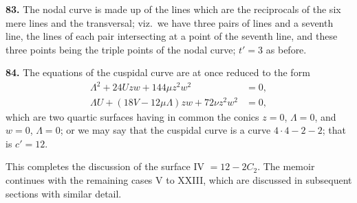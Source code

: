 \documentclass[11pt,a4paper]{article}
\theoremstyle{definition}
\begin{document}
\textbf{83.} The nodal curve is made up of the lines which are the reciprocals of the six mere lines and the transversal; viz.\ we have three pairs of lines and a seventh line, the lines of each pair intersecting at a point of the seventh line, and these three points being the triple points of the nodal curve; $t' = 3$ as before.

\textbf{84.} The equations of the cuspidal curve are at once reduced to the form
\begin{align*}
\Lambda^2 + 24Uzw + 144\mu z^2w^2 &= 0, \\
\Lambda U + (18V - 12\mu\Lambda)zw + 72\nu z^2w^2 &= 0,
\end{align*}
which are two quartic surfaces having in common the conics $z = 0$, $\Lambda = 0$, and $w = 0$, $\Lambda = 0$; or we may say that the cuspidal curve is a curve $4 \cdot 4 - 2 - 2$; that is $c' = 12$.

\newpage
\setcounter{page}{400}

This completes the discussion of the surface IV $= 12 - 2C_2$. The memoir continues with the remaining cases V to XXIII, which are discussed in subsequent sections with similar detail.
\end{document}
